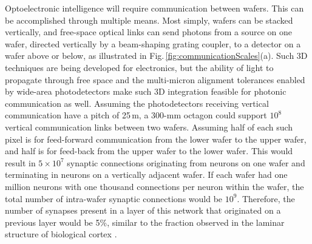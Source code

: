 \documentclass[twocolumn]{article}
\begin{document}
\begin{figure}[] 
\end{figure}
Optoelectronic intelligence will require communication between wafers. This can be accomplished through multiple means. Most simply, wafers can be stacked vertically, and free-space optical links can send photons from a source on one wafer, directed vertically by a beam-shaping grating coupler, to a detector on a wafer above or below, as illustrated in Fig.\,\ref{fig:communicationScales}(a). Such 3D techniques are being developed for electronics, but the ability of light to propagate through free space and the multi-micron alignment tolerances enabled by wide-area photodetectors \cite{mave2013} make such 3D integration feasible for photonic communication as well. Assuming the photodetectors receiving vertical communication have a pitch of 25\,\textmu m, a 300-mm octagon could support $10^8$ vertical communication links between two wafers. Assuming half of each such pixel is for feed-forward communication from the lower wafer to the upper wafer, and half is for feed-back from the upper wafer to the lower wafer. This would result in $5\times10^7$ synaptic connections originating from neurons on one wafer and terminating in neurons on a vertically adjacent wafer. If each wafer had one million neurons with one thousand connections per neuron within the wafer, the total number of intra-wafer synaptic connections would be $10^9$. Therefore, the number of synapses present in a layer of this network that originated on a previous layer would be 5\%, similar to the fraction observed in the laminar structure of biological cortex \cite{brsc1998,mo1997}.
\end{document}
